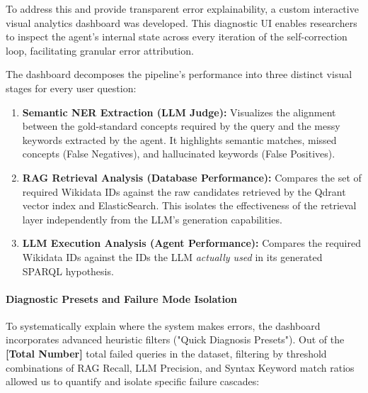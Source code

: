 To address this and provide transparent error explainability, a custom interactive visual analytics dashboard was developed. This diagnostic UI enables researchers to inspect the agent's internal state across every iteration of the self-correction loop, facilitating granular error attribution.

The dashboard decomposes the pipeline's performance into three distinct visual stages for every user question:
\begin{enumerate}
    \item \textbf{Semantic NER Extraction (LLM Judge):} Visualizes the alignment between the gold-standard concepts required by the query and the messy keywords extracted by the agent. It highlights semantic matches, missed concepts (False Negatives), and hallucinated keywords (False Positives).
    \item \textbf{RAG Retrieval Analysis (Database Performance):} Compares the set of required Wikidata IDs against the raw candidates retrieved by the Qdrant vector index and ElasticSearch. This isolates the effectiveness of the retrieval layer independently from the LLM's generation capabilities.
    \item \textbf{LLM Execution Analysis (Agent Performance):} Compares the required Wikidata IDs against the IDs the LLM \textit{actually used} in its generated SPARQL hypothesis. 
\end{enumerate}

\paragraph{Diagnostic Presets and Failure Mode Isolation}
To systematically explain where the system makes errors, the dashboard incorporates advanced heuristic filters ("Quick Diagnosis Presets"). Out of the \textbf{[Total Number]} total failed queries in the dataset, filtering by threshold combinations of RAG Recall, LLM Precision, and Syntax Keyword match ratios allowed us to quantify and isolate specific failure cascades:

